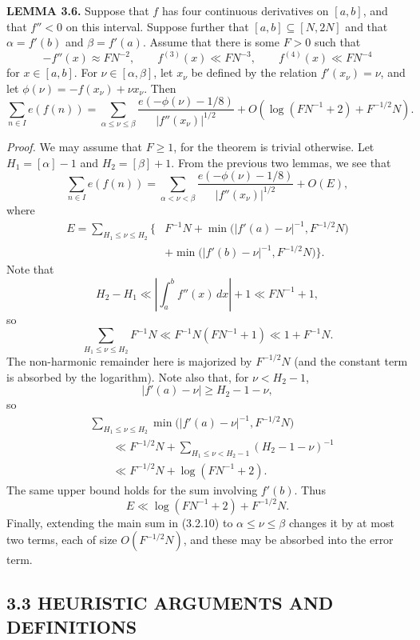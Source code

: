 \documentclass[10pt]{article}
\begin{document}
\medskip
\noindent\textbf{LEMMA 3.6.}
Suppose that $f$ has four continuous derivatives on $[a,b]$, and that
$f''<0$ on this interval. Suppose further that $[a,b]\subseteq[N,2N]$ and
that $\alpha=f'(b)$ and $\beta=f'(a)$. Assume that there is some $F>0$ such
that
\[
 -f''(x)\approx FN^{-2},
 \qquad f^{(3)}(x)\ll FN^{-3},
 \qquad f^{(4)}(x)\ll FN^{-4}
\]
for $x\in[a,b]$. For $\nu\in[\alpha,\beta]$, let $x_\nu$ be defined by the
relation $f'(x_\nu)=\nu$, and let
$\phi(\nu)=-f(x_\nu)+\nu x_\nu$. Then
\[
 \sum_{n\in I}e(f(n))
 =\sum_{\alpha\leq\nu\leq\beta}
  \frac{e(-\phi(\nu)-1/8)}{|f''(x_\nu)|^{1/2}}
 +O\left(\log(FN^{-1}+2)+F^{-1/2}N\right).
\]

\noindent\textit{Proof.}
We may assume that $F\geq1$, for the theorem is trivial otherwise. Let
$H_1=[\alpha]-1$ and $H_2=[\beta]+1$. From the previous two lemmas, we see
that
\begin{equation*}
 \sum_{n\in I}e(f(n))
 =\sum_{\alpha<\nu<\beta}
  \frac{e(-\phi(\nu)-1/8)}{|f''(x_\nu)|^{1/2}}+O(E), \tag{3.2.10}
\end{equation*}
where
\[
\begin{aligned}
 E=\sum_{H_1\leq\nu\leq H_2}\bigl\{&F^{-1}N
 +\min\bigl(|f'(a)-\nu|^{-1},F^{-1/2}N\bigr)\\
 &+\min\bigl(|f'(b)-\nu|^{-1},F^{-1/2}N\bigr)\bigr\}.
\end{aligned}
\]
Note that
\[
 H_2-H_1\ll\left|\int_a^b f''(x)\,dx\right|+1\ll FN^{-1}+1,
\]
so
\[
 \sum_{H_1\leq\nu\leq H_2}F^{-1}N
 \ll F^{-1}N(FN^{-1}+1)\ll1+F^{-1}N.
\]
The non-harmonic remainder here is majorized by $F^{-1/2}N$ (and the
constant term is absorbed by the logarithm). Note also that, for
$\nu<H_2-1$,
\[
 |f'(a)-\nu|\geq H_2-1-\nu,
\]
so
\[
\begin{aligned}
 &\sum_{H_1\leq\nu\leq H_2}
 \min\bigl(|f'(a)-\nu|^{-1},F^{-1/2}N\bigr) \\
 &\qquad\ll F^{-1/2}N
 +\sum_{H_1\leq\nu<H_2-1}(H_2-1-\nu)^{-1} \\
 &\qquad\ll F^{-1/2}N+\log(FN^{-1}+2).
\end{aligned}
\]
The same upper bound holds for the sum involving $f'(b)$. Thus
\[
 E\ll\log(FN^{-1}+2)+F^{-1/2}N.
\]
Finally, extending the main sum in (3.2.10) to
$\alpha\leq\nu\leq\beta$ changes it by at most two terms, each of size
$O(F^{-1/2}N)$, and these may be absorbed into the error term.

\subsection*{3.3 HEURISTIC ARGUMENTS AND DEFINITIONS}
\end{document}
